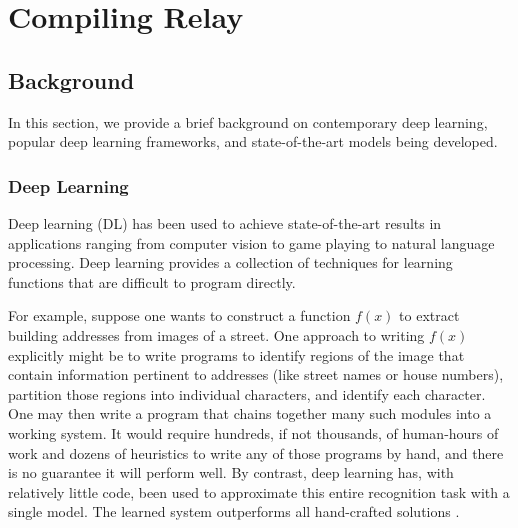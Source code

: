 \chapter{Compiling Relay}
\label{ch:compiler}

\section{Background}
\label{sec:background}


In this section, we provide a brief background on contemporary deep learning,
  popular deep learning frameworks, and state-of-the-art
  models being developed.

\subsection{Deep Learning}

Deep learning (DL) has been used to achieve state-of-the-art results in applications ranging from
computer vision to game playing to natural language processing. Deep learning provides a collection of
techniques for learning functions that are difficult to program directly.

For example, suppose one wants to construct a function $f(x)$ to extract building addresses from
images of a street. One approach to writing $f(x)$ explicitly might be to write programs to identify
regions of the image that contain information pertinent to addresses (like street names or house
numbers), partition those regions into individual characters, and identify each character.
One may then write a program that chains together many such modules into a working system.
It would require hundreds, if not thousands, of human-hours of work and dozens of heuristics to
write any of those programs by hand, and there is no guarantee it will perform well.
By contrast, deep learning has, with relatively little code, been
used to approximate this entire recognition task with a single model. The learned system
outperforms all hand-crafted solutions \citep{streetview}.

